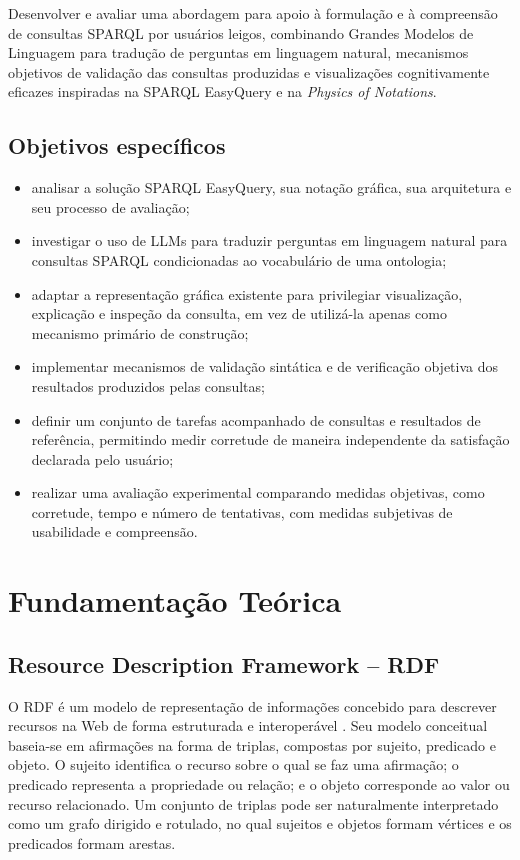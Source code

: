 \documentclass[10pt,a4paper]{article}
\begin{document}
Desenvolver e avaliar uma abordagem para apoio à formulação e à compreensão de consultas SPARQL por usuários leigos, combinando Grandes Modelos de Linguagem para tradução de perguntas em linguagem natural, mecanismos objetivos de validação das consultas produzidas e visualizações cognitivamente eficazes inspiradas na SPARQL EasyQuery e na \textit{Physics of Notations}.

\subsection*{Objetivos específicos}

\begin{itemize}
    \item analisar a solução SPARQL EasyQuery, sua notação gráfica, sua arquitetura e seu processo de avaliação;
    \item investigar o uso de LLMs para traduzir perguntas em linguagem natural para consultas SPARQL condicionadas ao vocabulário de uma ontologia;
    \item adaptar a representação gráfica existente para privilegiar visualização, explicação e inspeção da consulta, em vez de utilizá-la apenas como mecanismo primário de construção;
    \item implementar mecanismos de validação sintática e de verificação objetiva dos resultados produzidos pelas consultas;
    \item definir um conjunto de tarefas acompanhado de consultas e resultados de referência, permitindo medir corretude de maneira independente da satisfação declarada pelo usuário;
    \item realizar uma avaliação experimental comparando medidas objetivas, como corretude, tempo e número de tentativas, com medidas subjetivas de usabilidade e compreensão.
\end{itemize}

\section{Fundamentação Teórica}

\subsection{Resource Description Framework -- RDF}

O RDF é um modelo de representação de informações concebido para descrever recursos na Web de forma estruturada e interoperável \cite{rdf2014}. Seu modelo conceitual baseia-se em afirmações na forma de triplas, compostas por sujeito, predicado e objeto. O sujeito identifica o recurso sobre o qual se faz uma afirmação; o predicado representa a propriedade ou relação; e o objeto corresponde ao valor ou recurso relacionado. Um conjunto de triplas pode ser naturalmente interpretado como um grafo dirigido e rotulado, no qual sujeitos e objetos formam vértices e os predicados formam arestas.
\end{document}
